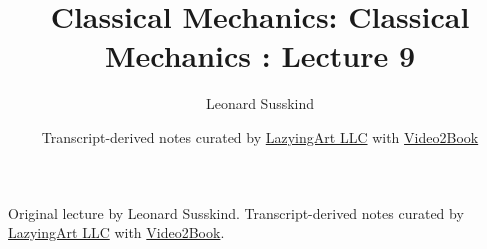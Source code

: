 \documentclass[11pt,oneside]{book}
\begin{document}
\frontmatter
\title{Classical Mechanics: Classical Mechanics : Lecture 9}
\author{Leonard Susskind}
\date{Transcript-derived notes curated by \href{https://lazying.art}{LazyingArt LLC} with \href{https://github.com/lachlanchen/Video2Book}{Video2Book}}
\maketitle
\begin{center}
\small Original lecture by Leonard Susskind. Transcript-derived notes curated by \href{https://lazying.art}{LazyingArt LLC} with \href{https://github.com/lachlanchen/Video2Book}{Video2Book}.
\end{center}
\clearpage
\mainmatter

\end{document}
